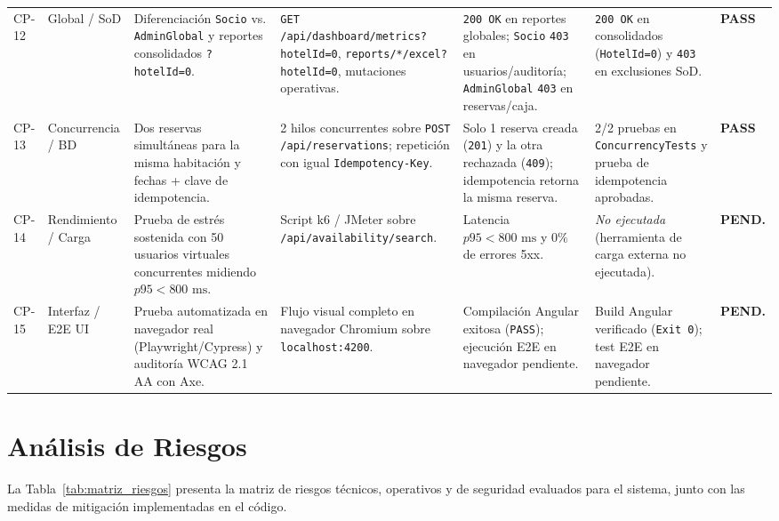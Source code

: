 \documentclass[12pt,a4paper]{article}
\begin{document}
\begin{longtable}{p{1.3cm} p{2.1cm} p{3.1cm} p{2.6cm} p{2.0cm} p{2.0cm} p{1.3cm}}
CP-12 & Global / SoD & Diferenciaci\'on \texttt{Socio} vs. \texttt{AdminGlobal} y reportes consolidados \texttt{?hotelId=0}. & \texttt{GET /api/dashboard/metrics?hotelId=0}, \texttt{reports/*/excel?hotelId=0}, mutaciones operativas. & \texttt{200 OK} en reportes globales; \texttt{Socio} \texttt{403} en usuarios/auditor\'ia; \texttt{AdminGlobal} \texttt{403} en reservas/caja. & \texttt{200 OK} en consolidados (\texttt{HotelId=0}) y \texttt{403} en exclusiones SoD. & \textcolor{verdepass}{\textbf{PASS}}\\[0.12cm]
CP-13 & Concurrencia / BD & Dos reservas simult\'aneas para la misma habitaci\'on y fechas + clave de idempotencia. & 2 hilos concurrentes sobre \texttt{POST /api/reservations}; repetici\'on con igual \texttt{Idempotency-Key}. & Solo 1 reserva creada (\texttt{201}) y la otra rechazada (\texttt{409}); idempotencia retorna la misma reserva. & 2/2 pruebas en \texttt{ConcurrencyTests} y prueba de idempotencia aprobadas. & \textcolor{verdepass}{\textbf{PASS}}\\[0.12cm]
CP-14 & Rendimiento / Carga & Prueba de estr\'es sostenida con 50 usuarios virtuales concurrentes midiendo $p95 < 800\text{ ms}$. & Script k6 / JMeter sobre \texttt{/api/availability/search}. & Latencia $p95 < 800\text{ ms}$ y $0\%$ de errores 5xx. & \textit{No ejecutada} (herramienta de carga externa no ejecutada). & \textcolor{ambarwarn}{\textbf{PEND.}}\\[0.12cm]
CP-15 & Interfaz / E2E UI & Prueba automatizada en navegador real (Playwright/Cypress) y auditor\'ia WCAG 2.1 AA con Axe. & Flujo visual completo en navegador Chromium sobre \texttt{localhost:4200}. & Compilaci\'on Angular exitosa (\texttt{PASS}); ejecuci\'on E2E en navegador pendiente. & Build Angular verificado (\texttt{Exit 0}); test E2E en navegador pendiente. & \textcolor{ambarwarn}{\textbf{PEND.}}\\
\end{longtable}

\section{An\'alisis de Riesgos}

La Tabla~\ref{tab:matriz_riesgos} presenta la matriz de riesgos t\'ecnicos, operativos y de seguridad evaluados para el sistema, junto con las medidas de mitigaci\'on implementadas en el c\'odigo.
\end{document}
